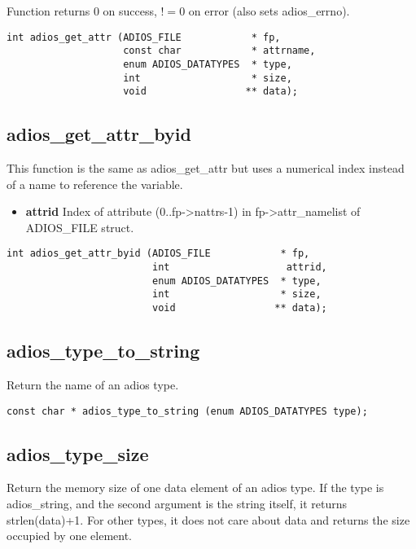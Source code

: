 Function returns 0 on success, $!=0$ on error (also sets adios\_errno).

\begin{lstlisting}[alsolanguage=C]
int adios_get_attr (ADIOS_FILE            * fp,
                    const char            * attrname,
                    enum ADIOS_DATATYPES  * type,
                    int                   * size,
                    void                 ** data);

\end{lstlisting}



\subsection{adios\_get\_attr\_byid}
This function is the same as adios\_get\_attr but uses a numerical index instead of a name to reference the variable. 
\begin{itemize}
\item{\bf attrid} Index of attribute (0..fp->nattrs-1) in fp->attr\_namelist of ADIOS\_FILE struct. 
\end{itemize}
\begin{lstlisting}[alsolanguage=C]
int adios_get_attr_byid (ADIOS_FILE            * fp, 
                         int                    attrid,  
                         enum ADIOS_DATATYPES  * type,
                         int                   * size, 
                         void                 ** data);
\end{lstlisting}



\subsection{adios\_type\_to\_string}
 Return the name of an adios type. 

\begin{lstlisting}[alsolanguage=C]
const char * adios_type_to_string (enum ADIOS_DATATYPES type);
\end{lstlisting}


\subsection{adios\_type\_size}
Return the memory size of one data element of an adios type.
If the type is adios\_string, and the second argument is
the string itself, it returns strlen(data)+1. 
For other types, it does not care about data and returns
the size occupied by one element.

